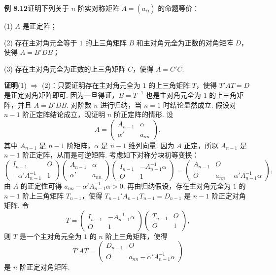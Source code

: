 \documentclass[UTF8,12pt,a4paper,fontset=fandol]{ctexart}
\begin{document}
\noindent\textbf{例 8.12}\quad 证明下列关于 $n$ 阶实对称矩阵 $A=(a_{ij})$ 的命题等价：

(1) $A$ 是正定阵；

(2) 存在主对角元全等于 $1$ 的上三角矩阵 $B$ 和主对角元全为正数的对角矩阵 $D$，使得 $A=B'DB$；

(3) 存在主对角元全为正数的上三角矩阵 $C$，使得 $A=C'C$.

\noindent\textbf{证明}\quad (1) $\Rightarrow$ (2)：只要证明存在主对角元全为 $1$ 的上三角矩阵 $T$，使得 $T'AT=D$ 是正定对角矩阵即可. 因为一旦得证，$B=T^{-1}$ 也是主对角元全为 $1$ 的上三角矩阵，并且 $A=B'DB$. 对阶数 $n$ 进行归纳，当 $n=1$ 时结论显然成立. 假设对 $n-1$ 阶正定阵结论成立，现证明 $n$ 阶正定阵的情形. 设
\[
A=\left(\begin{array}{cc}
A_{n-1} & \alpha\\
\alpha' & a_{nn}
\end{array}\right),
\]
其中 $A_{n-1}$ 是 $n-1$ 阶矩阵，$\alpha$ 是 $n-1$ 维列向量. 因为 $A$ 正定，所以 $A_{n-1}$ 是 $n-1$ 阶正定阵，从而是可逆矩阵. 考虑如下对称分块初等变换：
\[
\left(\begin{array}{cc}
I_{n-1} & O\\
-\alpha'A_{n-1}^{-1} & 1
\end{array}\right)
\left(\begin{array}{cc}
A_{n-1} & \alpha\\
\alpha' & a_{nn}
\end{array}\right)
\left(\begin{array}{cc}
I_{n-1} & -A_{n-1}^{-1}\alpha\\
O & 1
\end{array}\right)
=
\left(\begin{array}{cc}
A_{n-1} & O\\
O & a_{nn}-\alpha'A_{n-1}^{-1}\alpha
\end{array}\right),
\]
由 $A$ 的正定性可得 $a_{nn}-\alpha'A_{n-1}^{-1}\alpha>0$. 再由归纳假设，存在主对角元全为 $1$ 的 $n-1$ 阶上三角矩阵 $T_{n-1}$，使得 $T_{n-1}'A_{n-1}T_{n-1}=D_{n-1}$ 是 $n-1$ 阶正定对角矩阵. 令
\[
T=
\left(\begin{array}{cc}
I_{n-1} & -A_{n-1}^{-1}\alpha\\
O & 1
\end{array}\right)
\left(\begin{array}{cc}
T_{n-1} & O\\
O & 1
\end{array}\right),
\]
则 $T$ 是一个主对角元全为 $1$ 的 $n$ 阶上三角矩阵，使得
\[
T'AT=
\left(\begin{array}{cc}
D_{n-1} & O\\
O & a_{nn}-\alpha'A_{n-1}^{-1}\alpha
\end{array}\right)
\]
是 $n$ 阶正定对角矩阵.
\end{document}
